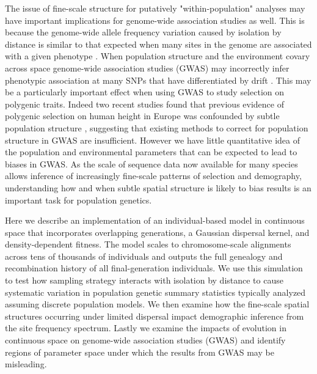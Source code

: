 \documentclass[11pt,twoside,lineno]{preprint}
\begin{document}
The issue of fine-scale structure for putatively "within-population" analyses may have important implications for genome-wide association studies as well. This is because the genome-wide allele frequency variation caused by isolation by distance is similar to that expected when many sites in the genome are associated with a given phenotype \citep{Bulik-Sullivan2015}. When population structure and the environment covary across space genome-wide association studies (GWAS) may incorrectly infer phenotypic association at many SNPs that have differentiated by drift \citep{Mathieson2012}. This may be a particularly important effect when using GWAS to study selection on polygenic traits. Indeed two recent studies found that previous evidence of polygenic selection on human height in Europe was confounded by subtle population structure \citep{Sohail2018,Berg2018}, suggesting that existing methods to correct for population structure in GWAS are insufficient. However we have little quantitative idea of the population and environmental parameters that can be expected to lead to biases in GWAS. As the scale of sequence data now available for many species allows inference of increasingly fine-scale patterns of selection and demography, understanding how and when subtle spatial structure is likely to bias results is an important task for population genetics.

Here we describe an implementation of an individual-based model in continuous space that incorporates overlapping generations, a Gaussian dispersal kernel, and density-dependent fitness. The model scales to chromosome-scale alignments across tens of thousands of individuals and outputs the full genealogy and recombination history of all final-generation individuals. We use this simulation to test how sampling strategy interacts with isolation by distance to cause systematic variation in population genetic summary statistics typically analyzed assuming discrete population models. We then examine how the fine-scale spatial structures occurring under limited dispersal impact demographic inference from the site frequency spectrum. Lastly we examine the impacts of evolution in continuous space on genome-wide association studies (GWAS) and identify regions of parameter space under which the results from GWAS may be misleading.
\end{document}
